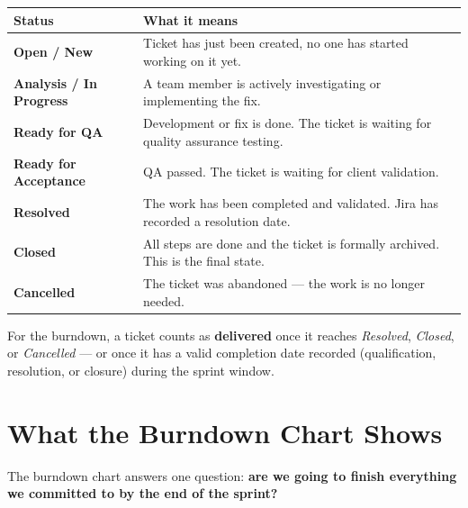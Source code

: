 \documentclass[12pt, a4paper]{article}
\begin{document}
\medskip
\begin{center}
\begin{tabular}{p{4cm} p{9cm}}
\toprule
\textbf{Status} & \textbf{What it means} \\
\midrule
\textbf{Open / New} &
  Ticket has just been created, no one has started working on it yet. \\[6pt]

\textbf{Analysis / In Progress} &
  A team member is actively investigating or implementing the fix. \\[6pt]

\textbf{Ready for QA} &
  Development or fix is done. The ticket is waiting for quality
  assurance testing. \\[6pt]

\textbf{Ready for Acceptance} &
  QA passed. The ticket is waiting for client validation. \\[6pt]

\textbf{Resolved} &
  The work has been completed and validated. Jira has recorded a
  resolution date. \\[6pt]

\textbf{Closed} &
  All steps are done and the ticket is formally archived.
  This is the final state. \\[6pt]

\textbf{Cancelled} &
  The ticket was abandoned --- the work is no longer needed. \\

\bottomrule
\end{tabular}
\end{center}

\medskip
For the burndown, a ticket counts as \textbf{delivered} once it reaches
\emph{Resolved}, \emph{Closed}, or \emph{Cancelled} --- or once it has a
valid completion date recorded (qualification, resolution, or closure)
during the sprint window.

\section{What the Burndown Chart Shows}

The burndown chart answers one question: \textbf{are we going to finish
everything we committed to by the end of the sprint?}
\end{document}
